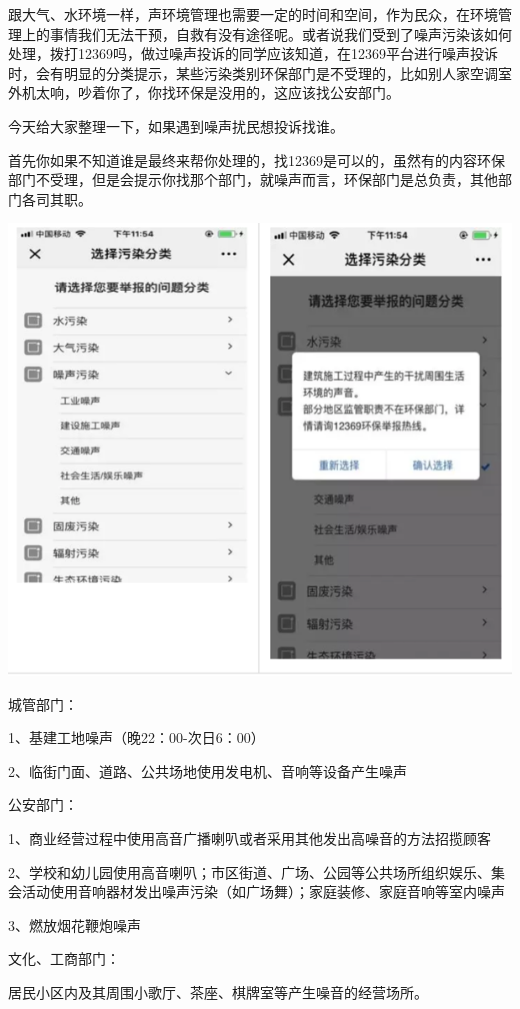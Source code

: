 \documentclass[
]{book}
\begin{document}
跟大气、水环境一样，声环境管理也需要一定的时间和空间，作为民众，在环境管理上的事情我们无法干预，自救有没有途径呢。或者说我们受到了噪声污染该如何处理，拨打12369吗，做过噪声投诉的同学应该知道，在12369平台进行噪声投诉时，会有明显的分类提示，某些污染类别环保部门是不受理的，比如别人家空调室外机太响，吵着你了，你找环保是没用的，这应该找公安部门。

今天给大家整理一下，如果遇到噪声扰民想投诉找谁。

首先你如果不知道谁是最终来帮你处理的，找12369是可以的，虽然有的内容环保部门不受理，但是会提示你找那个部门，就噪声而言，环保部门是总负责，其他部门各司其职。

\includegraphics[width=8.33in]{images/zaosheng3}

城管部门：

1、基建工地噪声（晚22：00-次日6：00）

2、临街门面、道路、公共场地使用发电机、音响等设备产生噪声

公安部门：

1、商业经营过程中使用高音广播喇叭或者采用其他发出高噪音的方法招揽顾客

2、学校和幼儿园使用高音喇叭；市区街道、广场、公园等公共场所组织娱乐、集会活动使用音响器材发出噪声污染（如广场舞）；家庭装修、家庭音响等室内噪声

3、燃放烟花鞭炮噪声

文化、工商部门：

居民小区内及其周围小歌厅、茶座、棋牌室等产生噪音的经营场所。
\end{document}
